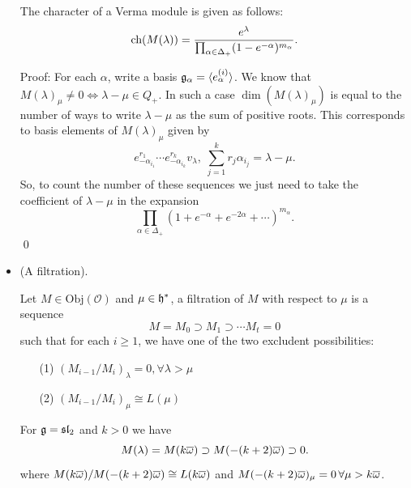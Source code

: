 \begin{itemize}
    \begin{dang}
        \begin{lemma}
        The character of a Verma module is given as follows:
        \begin{equation}
        \ch(M(\lambda)) = \frac{e^\lambda}{\prod_{\alpha\in\Delta_+}(1-e^{-\alpha})^{m_\alpha}}.
        \end{equation}
        \end{lemma}
    \end{dang}
    Proof: For each $\alpha$, write a basis $\fr{g}_\alpha=\langle e_\alpha^{(i)}\rangle$. We know that 
    $M(\lambda)_\mu\neq0\iff \lambda-\mu\in Q_+$. In such a case $\dim(M(\lambda)_\mu)$ is equal to the number 
    of ways to write $\lambda-\mu$ as the sum of positive roots. This corresponds to basis elements of 
    $M(\lambda)_\mu$ given by  
    \begin{equation}
        e_{-\alpha_{i_1}}^{r_1}\cdots e_{-\alpha_{i_k}}^{r_k}v_\lambda,\; \sum_{j=1}^k r_j\alpha_{i_j} = \lambda-\mu.
    \end{equation}
    So, to count the number of these sequences we just need to take the coefficient of $\lambda-\mu$ in the expansion
    \begin{equation}
        \prod_{\alpha\in\Delta_+}(1+e^{-\alpha}+e^{-2\alpha}+\cdots)^{m_\alpha}.
    \end{equation}
    \qed
    \item(A filtration).
    \begin{dang}
        \begin{definition}
            Let $M\in\text{Obj}(\mathcal{O})$ and $\mu\in\mathfrak{h}^*$, a filtration of $M$ with respect to $\mu$ is a sequence 
            \begin{equation}\label{equation: filtration}
                M=M_0\supset M_1\supset\cdots M_t = 0
            \end{equation}
            such that for each $i\geq1$, we have one of the two excludent possibilities:
            \begin{itemize}
                \item[(1)] $(M_{i-1}/M_i)_\lambda = 0,\forall \lambda > \mu$
                \item[(2)] $(M_{i-1}/M_i)_\mu\cong L(\mu)$
            \end{itemize}
        \end{definition}
    \end{dang}

    \begin{example}
        For $\mathfrak{g}=\mathfrak{sl}_2$ and $k>0$ we have 
        \begin{equation}
            M(\lambda) =  M(k\overline{\omega}) \supset M(-(k+2)\overline{\omega}) \supset 0.
        \end{equation}
        where $M(k\overline{\omega})/M(-(k+2)\overline{\omega})\cong L(k\overline{\omega})$ and $M(-(k+2)\overline{\omega})_{\mu} = 0\,\forall\mu>k\overline{\omega}$.
    \end{example}


\end{itemize}
